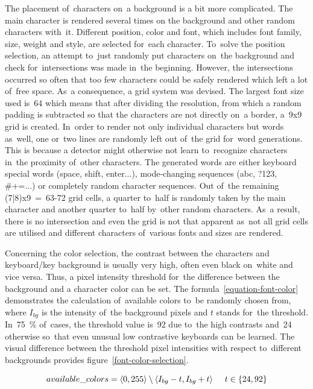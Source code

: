 The placement of~characters on~a background is a bit more complicated. The main character is rendered several times on the background and other random characters with~it. Different position, color and font, which includes font family, size, weight and style, are selected for~each character. To~solve the position selection, an attempt to~just randomly put characters on~the background and check for~intersections was made in~the beginning. However, the intersections occurred so often that too few characters could be safely rendered which left a lot of~free space. As~a consequence, a grid system was devised. The largest font size used is~64 which means that after dividing the resolution, from which a random padding is subtracted so that the characters are not directly on~a border, a~9x9 grid is created. In~order to render not only individual characters but words as~well, one or~two lines are randomly left out of~the grid for~word generations. This is because a detector might otherwise not learn to~recognize characters in~the proximity of~other characters. The generated words are either keyboard special words (space, shift, enter...), mode-changing sequences (abc, ?123, \#+=...) or completely random character sequences. Out of~the remaining (7|8)x9~=~63-72 grid cells, a quarter to~half is randomly taken by the main character and another quarter to~half by~other random characters. As~a result, there is no intersection and even the grid is not that apparent as~not all grid cells are utilised and different characters of~various fonts and sizes are rendered.

Concerning the color selection, the contrast between the characters and keyboard/key background is usually very high, often even black on~white and vice versa. Thus, a pixel intensity threshold for~the difference between the background and a character color can be set. The formula~\ref{equation-font-color} demonstrates the calculation of~available colors to~be randomly chosen from, where \(I_{bg}\) is the intensity of~the background pixels and \(t\) stands for~the threshold. In~75~\% of~cases, the threshold value is~92 due to~the high contrasts and~24 otherwise so~that even unusual low contrastive keyboards can be learned. The visual difference between the threshold pixel intensities with respect to~different backgrounds provides figure~\ref{font-color-selection}.

\begin{equation}
  \label{equation-font-color}
  available\_colors = \langle0, 255\rangle \setminus \langle I_{bg} - t, I_{bg} + t\rangle \hspace{0.5cm} t \in \{24, 92\}
\end{equation}

